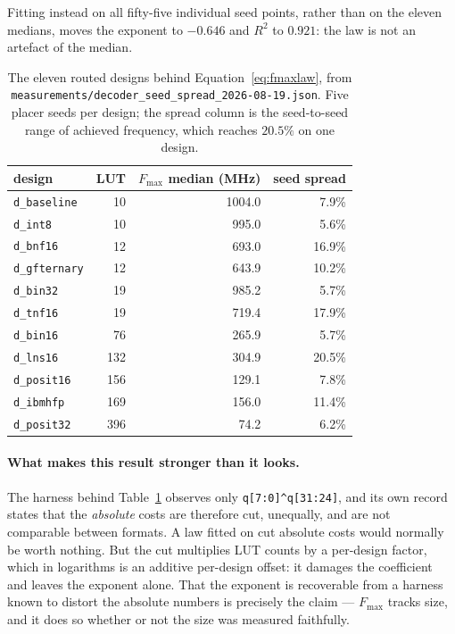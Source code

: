Fitting instead on all fifty-five individual seed points, rather than on the
eleven medians, moves the exponent to $-0.646$ and $R^2$ to $0.921$: the law is
not an artefact of the median.

\begin{table}[htbp]\centering
\begin{tabular}{lrrr}
\toprule
design & LUT & $F_{\max}$ median (MHz) & seed spread \\
\midrule
\texttt{d\_baseline}  &  10 & 1004.0 &  7.9\% \\
\texttt{d\_int8}      &  10 &  995.0 &  5.6\% \\
\texttt{d\_bnf16}     &  12 &  693.0 & 16.9\% \\
\texttt{d\_gfternary} &  12 &  643.9 & 10.2\% \\
\texttt{d\_bin32}     &  19 &  985.2 &  5.7\% \\
\texttt{d\_tnf16}     &  19 &  719.4 & 17.9\% \\
\texttt{d\_bin16}     &  76 &  265.9 &  5.7\% \\
\texttt{d\_lns16}     & 132 &  304.9 & 20.5\% \\
\texttt{d\_posit16}   & 156 &  129.1 &  7.8\% \\
\texttt{d\_ibmhfp}    & 169 &  156.0 & 11.4\% \\
\texttt{d\_posit32}   & 396 &   74.2 &  6.2\% \\
\bottomrule
\end{tabular}
\caption{The eleven routed designs behind Equation~\ref{eq:fmaxlaw}, from
\texttt{measurements/decoder\_seed\_spread\_2026-08-19.json}. Five placer seeds
per design; the spread column is the seed-to-seed range of achieved frequency,
which reaches $20.5\%$ on one design.}
\label{tab:fmaxrows}
\end{table}

\paragraph{What makes this result stronger than it looks.} The harness behind
Table~\ref{tab:fmaxrows} observes only \texttt{q[7:0]\^{}q[31:24]}, and its own
record states that the \emph{absolute} costs are therefore cut, unequally, and
are not comparable between formats. A law fitted on cut absolute costs would
normally be worth nothing. But the cut multiplies LUT counts by a per-design
factor, which in logarithms is an additive per-design offset: it damages the
coefficient and leaves the exponent alone. That the exponent is recoverable from
a harness known to distort the absolute numbers is precisely the claim ---
$F_{\max}$ tracks size, and it does so whether or not the size was measured
faithfully.

